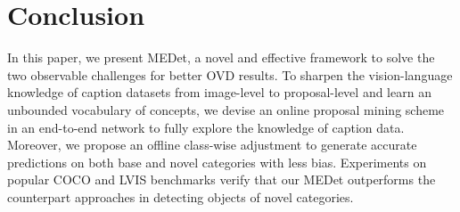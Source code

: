 \documentclass[10pt,twocolumn,letterpaper]{article}
\begin{document}
%
 \section{Conclusion}


In this paper, we present MEDet, a novel and effective framework to solve the two observable challenges for better OVD results.
To sharpen the vision-language knowledge of caption datasets from image-level to proposal-level and learn an unbounded vocabulary of concepts, we devise an online proposal mining scheme in an end-to-end network to fully explore the knowledge of caption data. Moreover, we propose an offline class-wise adjustment to generate accurate predictions on both base and novel categories with less bias.
Experiments on popular COCO and LVIS benchmarks verify that our MEDet outperforms the counterpart approaches in detecting objects of novel categories.
%
 
{\small


}
\end{document}
